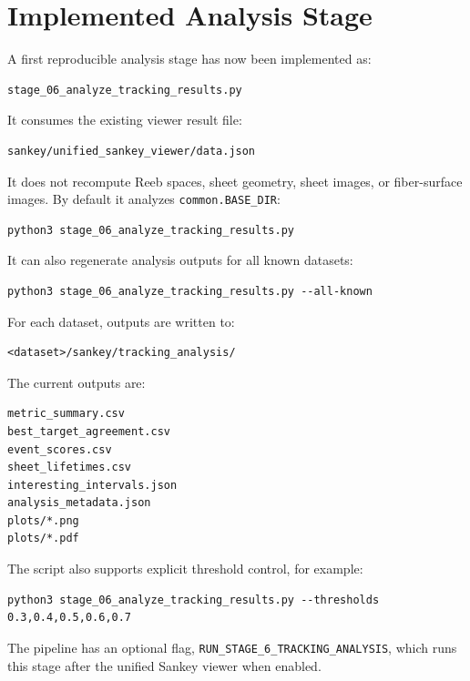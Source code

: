 \documentclass[11pt]{article}
\begin{document}
\section{Implemented Analysis Stage}

A first reproducible analysis stage has now been implemented as:

\begin{verbatim}
stage_06_analyze_tracking_results.py
\end{verbatim}

It consumes the existing viewer result file:

\begin{verbatim}
sankey/unified_sankey_viewer/data.json
\end{verbatim}

It does not recompute Reeb spaces, sheet geometry, sheet images, or
fiber-surface images. By default it analyzes \texttt{common.BASE\_DIR}:

\begin{verbatim}
python3 stage_06_analyze_tracking_results.py
\end{verbatim}

It can also regenerate analysis outputs for all known datasets:

\begin{verbatim}
python3 stage_06_analyze_tracking_results.py --all-known
\end{verbatim}

For each dataset, outputs are written to:

\begin{verbatim}
<dataset>/sankey/tracking_analysis/
\end{verbatim}

The current outputs are:

\begin{verbatim}
metric_summary.csv
best_target_agreement.csv
event_scores.csv
sheet_lifetimes.csv
interesting_intervals.json
analysis_metadata.json
plots/*.png
plots/*.pdf
\end{verbatim}

The script also supports explicit threshold control, for example:

\begin{verbatim}
python3 stage_06_analyze_tracking_results.py --thresholds 0.3,0.4,0.5,0.6,0.7
\end{verbatim}

The pipeline has an optional flag, \texttt{RUN\_STAGE\_6\_TRACKING\_ANALYSIS},
which runs this stage after the unified Sankey viewer when enabled.
\end{document}
